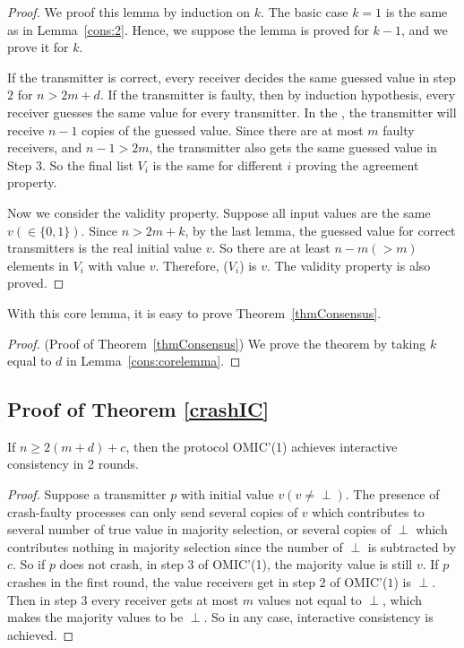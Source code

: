 \begin{proof}
We proof this lemma by induction on $k$. The basic case $k=1$ is the same as in Lemma~\ref{cons:2}.
Hence, we suppose the lemma is proved for $k-1$, and we prove it for $k$.

If the transmitter is correct, every receiver decides the same guessed value in step $2$ for $n>2m+d$. 
If the transmitter is faulty, then
by induction hypothesis, every receiver  guesses the same value for every transmitter. 
In the , the transmitter will receive $n-1$ copies of the guessed value. 
Since there are at most $m$ faulty receivers, and $n-1>2m$, the transmitter 
also gets the same guessed value in Step $3$. 
So the final list $V_i$ is the same for different $i$ proving the agreement property. 

Now we consider  the validity property.
Suppose all input values are the same $v(\in \{0,1\})$. 
Since $n>2m+k$, by the last lemma, the guessed value for correct transmitters is the real initial value $v$. So there are at least $n-m (> m)$ elements in $V_i$ with value $v$. Therefore, ($V_i$) is $v$. 
The validity property is also proved.
\end{proof}

With this core lemma, it is easy to prove Theorem~\ref{thmConsensus}.
\begin{proof}{(Proof of Theorem~\ref{thmConsensus})}
We prove the theorem by taking $k$ equal to $d$ in Lemma~\ref{cons:corelemma}.
\end{proof}

\iffalse
\subsection{Proof of Theorem \ref{crashIC}}

\begin{lemma}
  If $n \geqslant 2 ( m+d )+c$, then the protocol OMIC'(1) achieves
  interactive consistency in 2 rounds.
\end{lemma}

\begin{proof}
  Suppose a transmitter $p$ with initial value $v ( v \neq \perp )$. The
  presence of crash-faulty processes can only send several copies of $v$ which
  contributes to several number of true value in majority selection, or
  several copies of $\perp$ which contributes nothing in majority selection
  since the number of $\perp$ is subtracted by $c$. So if $p$ does not crash,
  in step $3$ of OMIC'(1), the majority value is still $v$. If $p$ crashes in
  the first round, the value receivers get in step $2$ of OMIC'($1$) is
  $\perp$. Then in step $3$ every receiver gets at most $m$ values not equal
  to $\perp$, which makes the majority values to be $\perp$. So in any case,
  interactive consistency is achieved.
\end{proof}

